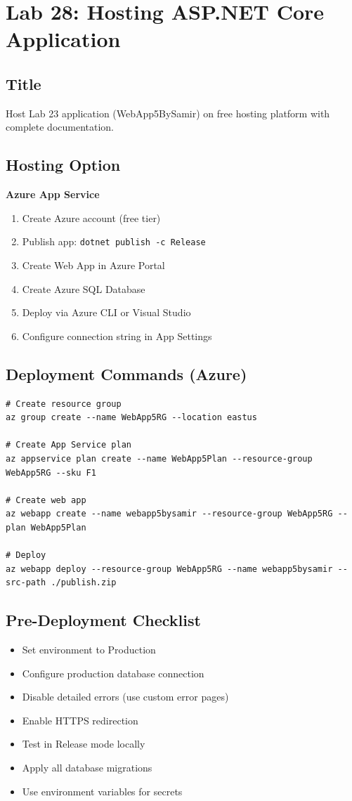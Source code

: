 \documentclass[10pt,a4paper]{article}
\begin{document}
\section*{Lab 28: Hosting ASP.NET Core Application}

\subsection*{Title}
Host Lab 23 application (WebApp5BySamir) on free hosting platform with complete documentation.

\subsection*{Hosting Option}

\textbf{ Azure App Service}
\begin{enumerate}
    \item Create Azure account (free tier)
    \item Publish app: \texttt{dotnet publish -c Release}
    \item Create Web App in Azure Portal
    \item Create Azure SQL Database
    \item Deploy via Azure CLI or Visual Studio
    \item Configure connection string in App Settings
\end{enumerate}


\subsection*{Deployment Commands (Azure)}
\begin{lstlisting}[basicstyle=\ttfamily\scriptsize]
# Create resource group
az group create --name WebApp5RG --location eastus

# Create App Service plan
az appservice plan create --name WebApp5Plan --resource-group WebApp5RG --sku F1

# Create web app
az webapp create --name webapp5bysamir --resource-group WebApp5RG --plan WebApp5Plan

# Deploy
az webapp deploy --resource-group WebApp5RG --name webapp5bysamir --src-path ./publish.zip
\end{lstlisting}

\subsection*{Pre-Deployment Checklist}
\begin{itemize}
    \item Set environment to Production
    \item Configure production database connection
    \item Disable detailed errors (use custom error pages)
    \item Enable HTTPS redirection
    \item Test in Release mode locally
    \item Apply all database migrations
    \item Use environment variables for secrets
\end{itemize}
\end{document}

